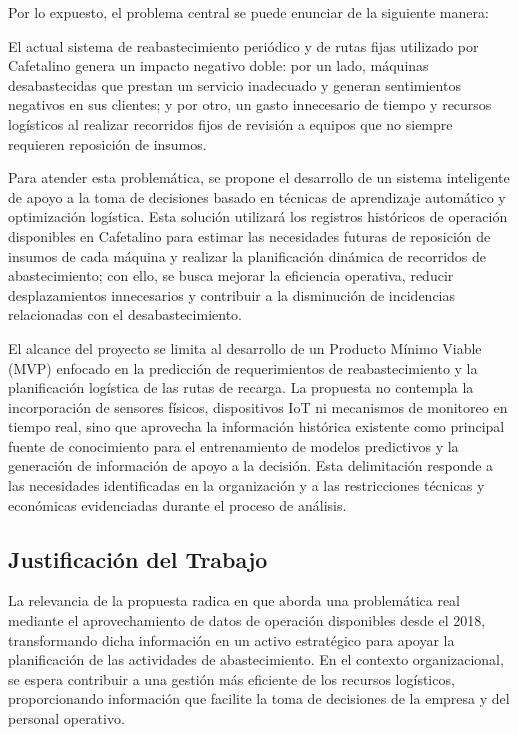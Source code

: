 Por lo expuesto, el problema central se puede enunciar de la siguiente manera:

El actual sistema de reabastecimiento periódico y de rutas fijas utilizado por Cafetalino genera un impacto negativo doble: por un lado, máquinas desabastecidas que prestan un servicio inadecuado y generan sentimientos negativos en sus clientes; y por otro, un gasto innecesario de tiempo y recursos logísticos al realizar recorridos fijos de revisión a equipos que no siempre requieren reposición de insumos.

Para atender esta problemática, se propone el desarrollo de un sistema inteligente de apoyo a la toma de decisiones basado en técnicas de aprendizaje automático y optimización logística. Esta solución utilizará los registros históricos de operación disponibles en Cafetalino para estimar las necesidades futuras de reposición de insumos de cada máquina y realizar la planificación dinámica de recorridos de abastecimiento; con ello, se busca mejorar la eficiencia operativa, reducir desplazamientos innecesarios y contribuir a la disminución de incidencias relacionadas con el desabastecimiento.

El alcance del proyecto se limita al desarrollo de un Producto Mínimo Viable (MVP) enfocado en la predicción de requerimientos de reabastecimiento y la planificación logística de las rutas de recarga. La propuesta no contempla la incorporación de sensores físicos, dispositivos IoT ni mecanismos de monitoreo en tiempo real, sino que aprovecha la información histórica existente como principal fuente de conocimiento para el entrenamiento de modelos predictivos y la generación de información de apoyo a la decisión. Esta delimitación responde a las necesidades identificadas en la organización y a las restricciones técnicas y económicas evidenciadas durante el proceso de análisis.

\subsection{Justificación del Trabajo}\label{justificaciuxf3n-del-trabajo}

La relevancia de la propuesta radica en que aborda una problemática real mediante el aprovechamiento de datos de operación disponibles desde el 2018, transformando dicha información en un activo estratégico para apoyar la planificación de las actividades de abastecimiento. En el contexto organizacional, se espera contribuir a una gestión más eficiente de los recursos logísticos, proporcionando información que facilite la toma de decisiones de la empresa y del personal operativo.


